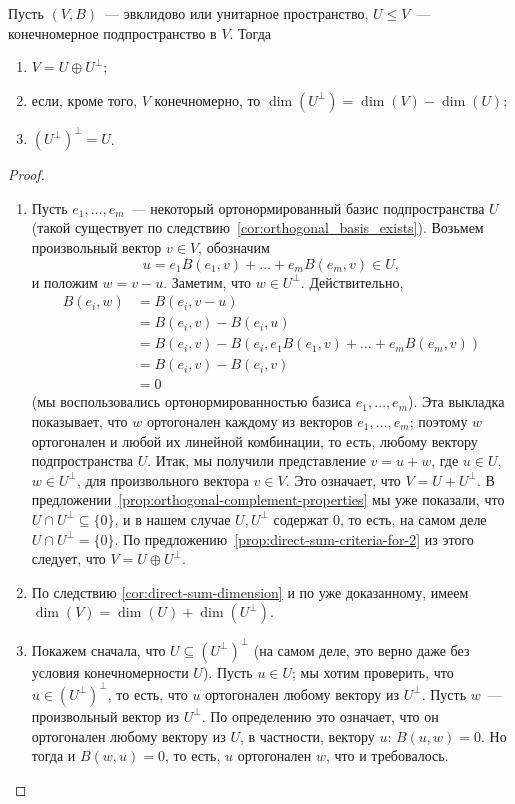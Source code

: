 \begin{proposition}\label{prop:orthogonal-complement-properties-findim}
Пусть $(V,B)$~--- эвклидово или унитарное пространство,
$U\leq V$~--- конечномерное подпространство в $V$. Тогда
\begin{enumerate}
\item\label{num:orth-comp-prop-findim-1} $V = U\oplus U^\perp$;
\item если, кроме того, $V$ конечномерно, то $\dim (U^\perp) = \dim (V) - \dim (U)$;
\item $(U^\perp)^\perp = U$.
\end{enumerate}
\end{proposition}
\begin{proof}
\begin{enumerate}
\item Пусть $e_1,\dots,e_m$~--- некоторый ортонормированный базис
  подпространства $U$ (такой существует по
  следствию~\ref{cor:orthogonal_basis_exists}).
  Возьмем произвольный вектор $v\in V$, обозначим
  $$
  u = e_1 B(e_1,v) + \dots + e_m B(e_m,v) \in U,
  $$
  и положим $w = v-u$.
  Заметим, что $w\in U^\perp$. Действительно,
  \begin{align*}
  B(e_i,w) &= B(e_i,v-u) \\
  &= B(e_i,v) - B(e_i,u) \\
  &= B(e_i,v) - B(e_i,e_1 B(e_1,v) + \dots + e_m B(e_m,v)) \\
  &= B(e_i,v) - B(e_i,v) \\
  &= 0
  \end{align*}
  (мы воспользовались ортонормированностью базиса $e_1,\dots,e_m$).
  Эта выкладка показывает, что $w$ ортогонален каждому из векторов
  $e_1,\dots,e_m$; поэтому $w$ ортогонален и любой их линейной комбинации,
  то есть, любому вектору подпространства $U$.
  Итак, мы получили представление $v = u + w$, где $u\in U$, $w\in U^\perp$,
  для произвольного вектора $v\in V$. Это означает, что $V = U + U^\perp$.
  В предложении~\ref{prop:orthogonal-complement-properties} мы уже показали,
  что $U\cap U^\perp \subseteq \{0\}$, и в нашем случае $U,U^\perp$ содержат $0$,
  то есть, на самом деле $U\cap U^\perp = \{0\}$.
  По предложению~\ref{prop:direct-sum-criteria-for-2} из этого следует, что
  $V = U\oplus U^\perp$.
\item По следствию \ref{cor:direct-sum-dimension} и по уже доказанному,
  имеем $\dim(V) = \dim(U) + \dim(U^\perp)$.
\item Покажем сначала, что $U\subseteq (U^\perp)^\perp$ (на самом деле, это
  верно даже без условия конечномерности $U$). Пусть $u\in U$; мы хотим проверить,
  что $u\in (U^\perp)^\perp$, то есть, что $u$ ортогонален любому вектору
  из $U^\perp$. Пусть $w$~--- произвольный вектор из $U^\perp$. По определению
  это означает, что он ортогонален любому вектору из $U$, в частности, вектору $u$:
  $B(u,w) = 0$. Но тогда и $B(w,u) = 0$, то есть, $u$ ортогонален $w$, что и
  требовалось.


\end{enumerate}
\end{proof}
